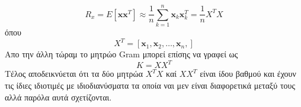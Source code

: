 \newline\hspace*{\fill}
\begin{equation}
        R_{x} = E[\mathbf{x}\mathbf{x}^{T}] \approx \dfrac{1}{n} \sum_{k=1}^{n} \mathbf{x}_{k}\mathbf{x}_{k}^{T} = \dfrac{1}{n} X^{T}X
\end{equation}
\hspace*{\fill}\newline
όπου 
\newline\hspace*{\fill}
\begin{equation}
        X^{Τ} = [\mathbf{x}_{1},\mathbf{x}_{2},\ldots,\mathbf{x}_{n},]
\end{equation}
\hspace*{\fill}\newline
Απο την άλλη τώραμ το μητρώο \textlatin{Gram} μπορεί επίσης να γραφεί ως 
\newline\hspace*{\fill}
\begin{equation}
        K = XX^{T}
\end{equation}
\hspace*{\fill}\newline
Τέλος αποδεικνύεται ότι τα δύο μητρώα $X^{T}X$ καί $XX^{T}$ είναι ίδου βαθμού και έχουν τις ίδιες ιδιοτιμές με ιδιοδιανύσματα τα οποία ναι μεν είναι διαφορετικά μεταξύ τους αλλά παρόλα αυτά σχετίζονται.

